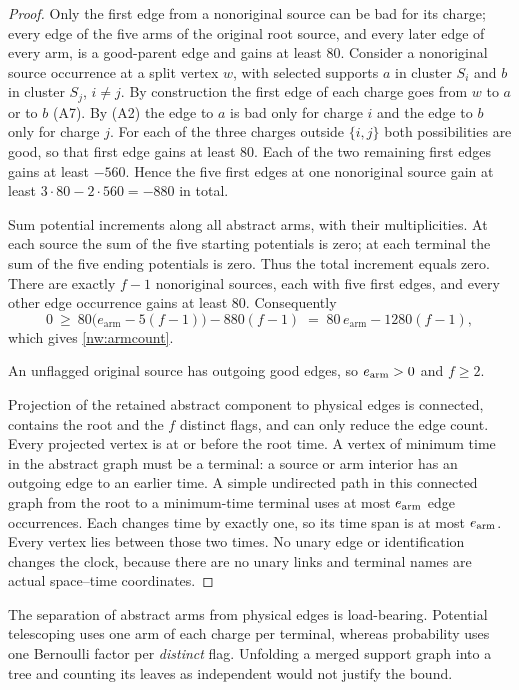 \begin{proof}
Only the first edge from a nonoriginal source can be bad for its charge; every edge of the five
arms of the original root source, and every later edge of every arm, is a good-parent edge and gains
at least $80$. Consider a nonoriginal source occurrence at a split vertex $w$, with selected supports
$a$ in cluster $S_i$ and $b$ in cluster $S_j$, $i\ne j$. By construction the first edge of each
charge goes from $w$ to $a$ or to $b$ (A7). By (A2) the edge to $a$ is bad only for charge $i$ and
the edge to $b$ only for charge $j$. For each of the three charges outside $\{i,j\}$ both
possibilities are good, so that first edge gains at least $80$. Each of the two remaining first
edges gains at least $-560$. Hence the five first edges at one nonoriginal source gain at least
$3\cdot80-2\cdot560=-880$ in total.

Sum potential increments along all abstract arms, with their multiplicities. At each source the sum
of the five starting potentials is zero; at each terminal the sum of the five ending potentials is
zero. Thus the total increment equals zero. There are exactly $f-1$ nonoriginal sources, each with
five first edges, and every other edge occurrence gains at least $80$. Consequently
\[
  0\ \ge\ 80\bigl(e_{\mathrm{arm}}-5(f-1)\bigr)-880(f-1)
   \;=\;80\,e_{\mathrm{arm}}-1280(f-1),
\]
which gives \eqref{nw:armcount}.

An unflagged original source has outgoing good edges, so $e_{\rm arm}>0$ and $f\ge2$.

Projection of the retained abstract component to physical edges is connected, contains the root and the $f$ distinct flags, and can only reduce the edge count. Every projected vertex is at or before the root time. A vertex of minimum time in the abstract graph must be a terminal: a source or arm interior has an outgoing edge to an earlier time. A simple undirected path in this connected graph from the root to a minimum-time terminal uses at most $e_{\rm arm}$ edge occurrences. Each changes time by exactly one, so its time span is at most $e_{\rm arm}$. Every vertex lies between those two times. No unary edge or identification changes the clock, because there are no unary links and terminal names are actual space--time coordinates.
\end{proof}

The separation of abstract arms from physical edges is load-bearing. Potential telescoping uses one arm of each charge per terminal, whereas probability uses one Bernoulli factor per \emph{distinct} flag. Unfolding a merged support graph into a tree and counting its leaves as independent would not justify the bound.

